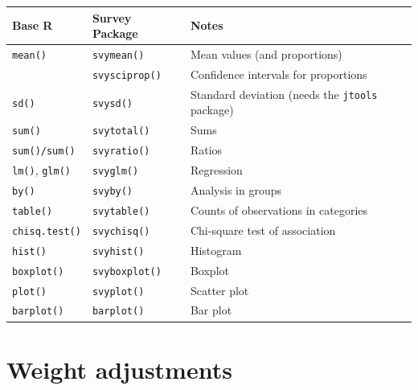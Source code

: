 \documentclass[
]{book}
\newcounter{none} %
\begin{document}
{\def\LTcaptype{none} %
\begin{longtable}[]{@{}
  >{\centering\arraybackslash}p{}
  >{\centering\arraybackslash}p{}
  >{\centering\arraybackslash}p{}@{}}
\toprule\noalign{}
\begin{minipage}[b]{\linewidth}\centering
Base R
\end{minipage} & \begin{minipage}[b]{\linewidth}\centering
Survey Package
\end{minipage} & \begin{minipage}[b]{\linewidth}\centering
Notes
\end{minipage} \\
\midrule\noalign{}
\endhead
\bottomrule\noalign{}
\endlastfoot
\texttt{mean()} & \texttt{svymean()} & Mean values (and proportions) \\
& \texttt{svysciprop()} & Confidence intervals for proportions \\
\texttt{sd()} & \texttt{svysd()} & Standard deviation (needs the \texttt{jtools} package) \\
\texttt{sum()} & \texttt{svytotal()} & Sums \\
\texttt{sum()/sum()} & \texttt{svyratio()} & Ratios \\
\texttt{lm()}, \texttt{glm()} & \texttt{svyglm()} & Regression \\
\texttt{by()} & \texttt{svyby()} & Analysis in groups \\
\texttt{table()} & \texttt{svytable()} & Counts of observations in categories \\
\texttt{chisq.test()} & \texttt{svychisq()} & Chi-square test of association \\
\texttt{hist()} & \texttt{svyhist()} & Histogram \\
\texttt{boxplot()} & \texttt{svyboxplot()} & Boxplot \\
\texttt{plot()} & \texttt{svyplot()} & Scatter plot \\
\texttt{barplot()} & \texttt{barplot()} & Bar plot \\
\end{longtable}
}

\chapter{Weight adjustments}\label{weight-adjustments}
\end{document}
